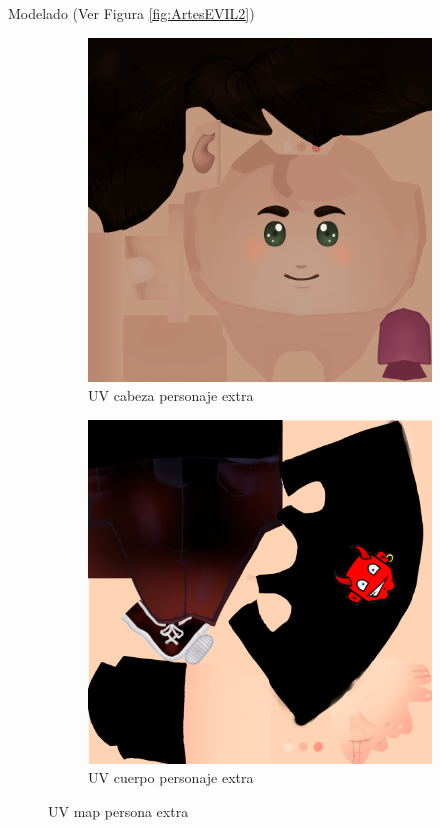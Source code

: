 \documentclass[12pt, a4paper,twoside,titlepage]{book}
\begin{document}
 Modelado (Ver Figura \ref{fig:ArtesEVIL2})
 \begin{figure}
\centering
\begin{subfigure}{.5\textwidth}
  \centering
  \includegraphics[width=.95\linewidth]{TGF/Artes/EVIL_head.png}
  \caption{UV cabeza personaje extra}
\end{subfigure}%
\begin{subfigure}{.5\textwidth}
  \centering
  \includegraphics[width=.95\linewidth]{TGF/Artes/EVIL_body.png}
  \caption{UV cuerpo personaje extra}
\end{subfigure}
\caption{UV map persona extra}
\label{fig:ArtesEVIL1}
\end{figure}
\end{document}
